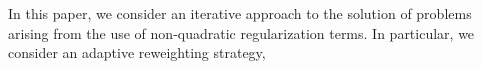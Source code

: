 In this paper, we consider an iterative approach to the solution of
problems arising from the use of non-quadratic regularization terms.
In particular, we consider an adaptive reweighting strategy, 
